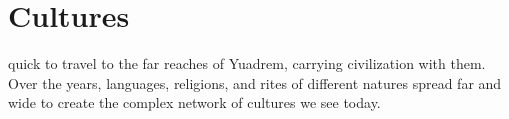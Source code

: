 \section{Cultures} \label{sec::cultures}

quick to travel to the far reaches of Yuadrem, carrying civilization with them.
Over the years, languages, religions, and rites of different natures spread far and wide to create the complex network of cultures we see today.




